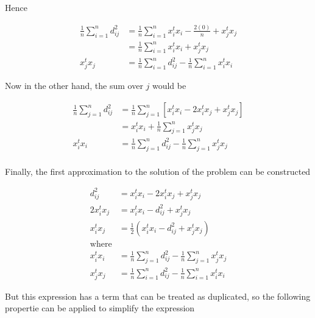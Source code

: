 \documentclass[12pt,journal]{IEEEtran}
\begin{document}
    Hence

    \begin{equation*}
        \begin{aligned}
            \frac{1}{n} \sum_{i=1}^n d_{ij}^2
            &=
            \frac{1}{n} \sum_{i=1}^n x_i^t x_i - \frac{2(0)}{n} + x_j^t x_j\\
            &=
            \frac{1}{n} \sum_{i=1}^n x_i^t x_i + x_j^t x_j\\
            x_j^t x_j &= \frac{1}{n} \sum_{i=1}^n d_{ij}^2 - \frac{1}{n} \sum_{i=1}^n x_i^t x_i
        \end{aligned}
    \end{equation*}

    Now in the other hand, the sum over $j$ would be

    \begin{equation*}
        \begin{aligned}
            \frac{1}{n} \sum_{j=1}^n d_{ij}^2
            &=
            \frac{1}{n} \sum_{j=1}^n [x_i^t x_i - 2 x_i^t x_j + x_j^t x_j]\\
            &=
            x_i^t x_i + \frac{1}{n} \sum_{j=1}^n x_j^t x_j\\
            x_i^t x_i &= \frac{1}{n} \sum_{j=1}^n d_{ij}^2 - \frac{1}{n} \sum_{j=1}^n x_j^t x_j\\
        \end{aligned}
    \end{equation*}

    Finally, the first approximation to the solution of the problem can be
    constructed

    \begin{equation*}
        \begin{aligned}
            d_{ij}^2 &= x_i^t x_i - 2 x_i^t x_j + x_j^t x_j\\
            2 x_i^t x_j &= x_i^t x_i - d_{ij}^2 + x_j^t x_j\\
            x_i^t x_j &= \frac{1}{2} (x_i^t x_i - d_{ij}^2 + x_j^t x_j)\\
            \text{where}\\
            x_i^t x_i &= \frac{1}{n} \sum_{j=1}^n d_{ij}^2 - \frac{1}{n} \sum_{j=1}^n x_j^t x_j\\
            x_j^t x_j &= \frac{1}{n} \sum_{i=1}^n d_{ij}^2 - \frac{1}{n} \sum_{i=1}^n x_i^t x_i
        \end{aligned}
    \end{equation*}

    But this expression has a term that can be treated as duplicated, so the
    following propertie can be applied to simplify the expression
\end{document}
